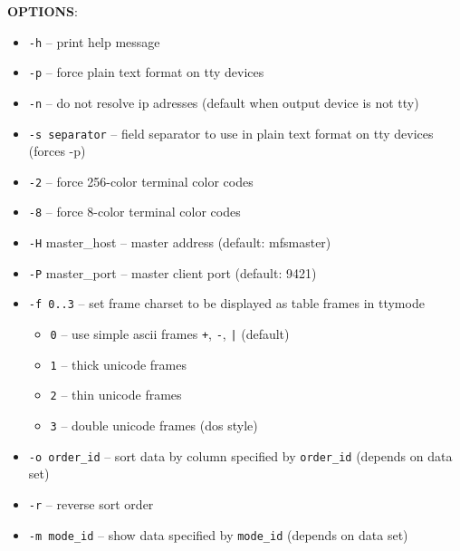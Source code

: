 \documentclass[a4paper,11pt,english]{report}
\def\code#1{\texttt{#1}}
\begin{document}
				\textbf{OPTIONS}:
				\begin{itemize}
					\item \code{-h} -- print help message
					\item \code{-p} -- force plain text format on tty devices
					\item \code{-n} -- do not resolve ip adresses (default when output device is not tty)
					\item \code{-s separator} -- field separator to use in plain text format on tty devices (forces -p)
					\item \code{-2} -- force 256-color terminal color codes
					\item \code{-8} -- force 8-color terminal color codes
					\item \code{-H} master\_host -- master address (default: mfsmaster)
					\item \code{-P} master\_port -- master client port (default: 9421)

					\item \code{-f 0..3} -- set frame charset to be displayed as table frames in ttymode
					\begin{itemize}
						\item \code{0} -- use simple ascii frames \code{+}, \code{-}, \code{|} (default)
						\item \code{1} -- thick unicode frames
						\item \code{2} -- thin unicode frames
						\item \code{3} -- double unicode frames (dos style)
					\end{itemize}
					
					\item \code{-o order\_id} -- sort data by column specified by \code{order\_id} (depends on data set)
					\item \code{-r} -- reverse sort order
					\item \code{-m mode\_id} -- show data specified by \code{mode\_id} (depends on data set)
				\end{itemize}
				\bigskip
				
\end{document}
